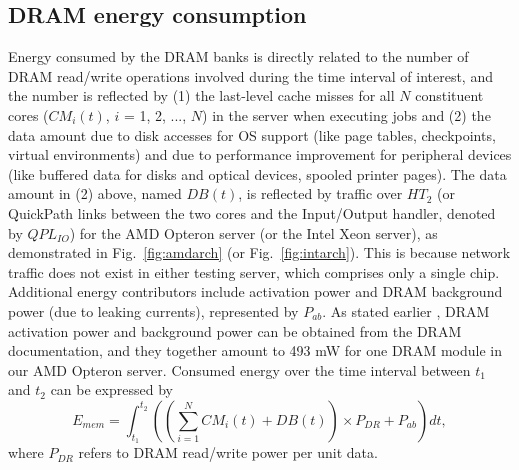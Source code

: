 \documentclass[prodmode,acmtaco,pdftex]{acmsmall}
\newcommand{\figurename}{Fig.}
\begin{document}
\subsection{DRAM energy consumption}
\label{sec:dram}
Energy consumed by the DRAM banks is directly related to the number of
DRAM read/write operations involved during the time interval of
interest, and the number is reflected by (1) the last-level cache misses
for all $N$ constituent cores ($CM_{i}(t)$, $i$ = 1, 2, ..., $N$) in
the server when executing jobs and (2) the data amount due to disk
accesses for OS support (like page tables, checkpoints, virtual
environments) and due to performance improvement for peripheral devices
(like buffered data for disks and optical devices, spooled printer
pages).  The data amount in (2) above, named $DB(t)$, is reflected by
traffic over $HT_{2}$ (or QuickPath links between the two cores and the
Input/Output handler, denoted by $QPL_{IO}$) for the AMD Opteron server
(or the Intel Xeon server), as demonstrated in
\figurename~\ref{fig:amdarch} (or \figurename~\ref{fig:intarch}).
This is because network traffic does not exist in either testing server,
which comprises only a single chip.  Additional energy contributors
include activation power and DRAM background power (due to leaking
currents), represented by $P_{ab}$.  As stated earlier
\cite{Micron2007}, DRAM activation power and background power can be
obtained from the DRAM documentation, and they together amount to 493 mW
for one DRAM module in our AMD Opteron server.  Consumed energy over the
time interval between $t_{1}$ and $t_{2}$ can be expressed by
\begin{equation*}
  \label{eq:dram}
  E_{mem}=\displaystyle\int_{t_{1}}^{t_{2}}\left( (\sum_{i=1}^{N}CM_{i}(t)+DB(t))\times
    P_{DR}+P_{ab}\right)dt,
\end{equation*} 
where $P_{DR}$ refers to DRAM read/write power per unit data.
\begin{table}%
\end{table}
\end{document}
